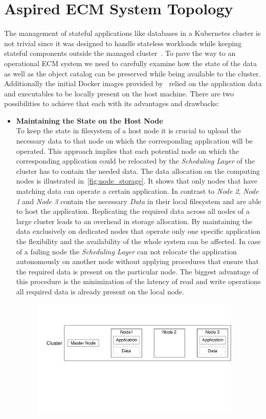 \section{Aspired ECM System Topology}
The management of stateful applications like databases in a Kubernetes cluster is not trivial since it was designed to handle stateless workloads while keeping stateful components outside the managed cluster~\cite{KUB2}.
To pave the way to an operational ECM system we need to carefully examine how the state of the data as well as the object catalog can be preserved while being available to the cluster.
Additionally the initial Docker images provided by~\cite{shao} relied on the application data and executables to be locally present on the host machine.
There are two possibilities to achieve that each with its advantages and drawbacks:
\begin{itemize}
    \item[]{\textbf{Maintaining the State on the Host Node}\\
    To keep the state in filesystem of a host node it is crucial to upload the necessary data to that node on which the corresponding application will be operated.
    This approach implies that each potential node on which the corresponding application could be relocated by the \textit{Scheduling Layer} of the cluster has to contain the needed data.
    The data allocation on the computing nodes is illustrated in~\cref{fig:node_storage}.
    It shows that only nodes that have matching data can operate a certain application.
    In contrast to \textit{Node 2}, \textit{Node 1} and \textit{Node 3} contain the necessary \textit{Data} in their local filesystem and are able to host the application.
    Replicating the required data across all nodes of a large cluster leads to an overhead in storage allocation.
    By maintaining the data exclusively on dedicated nodes that operate only one specific application the flexibility and the availability of the whole system can be affected.
    In case of a failing node the \textit{Scheduling Layer} can not relocate the application autonomously on another node without applying procedures that ensure that the required data is present on the particular node.
    The biggest advantage of this procedure is the minimization of the latency of read and write operations all required data is already present on the local node.
    \begin{figure}[h]
    \centering
    \includegraphics[width=0.95\textwidth]{graphics/node_storage.svg}

\end{figure}}
\end{itemize}
